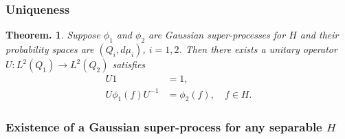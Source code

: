 \documentclass[openany, a4paper, oneside]{jsbook}
\theoremstyle{break}
\newtheorem{thm}{Theorem.}[section]
\theoremstyle{breakdefn}
\begin{document}
\subsubsection{Uniqueness}


\begin{thm}
 Suppose $\phi_1$ and $\phi_2$ are Gaussian super-processes for $H$ and their probability spaces are $(Q_i, d \mu_i)$, $i=1,2$.
 Then there exists a unitary operator $U \colon L^2 (Q_1) \to L^2 (Q_2)$ satisfies
 \begin{align}
  U1 &= 1, \\
  U \phi_1 (f) U^{-1} &= \phi_2 (f), \quad f \in H.
 \end{align}
\end{thm}
\subsubsection{Existence of a Gaussian super-process for any separable $H$}
\end{document}
